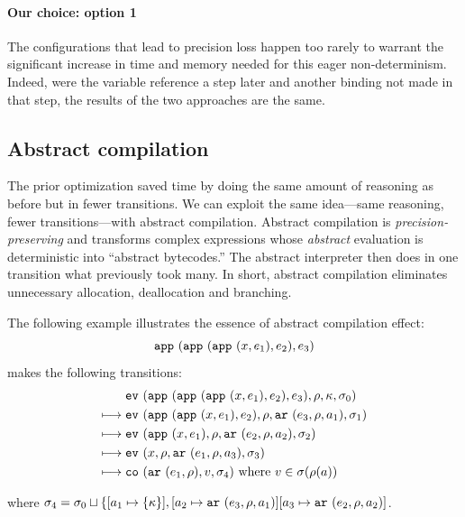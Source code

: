 \documentclass[preprint,onecolumn,9pt]{sigplanconf} %
\begin{document}
\paragraph{Our choice: option 1}
The configurations that lead to precision loss happen too rarely to
warrant the significant increase in time and memory needed for this
eager non-determinism. Indeed, were the variable reference a step
later and another binding not made in that step, the results of the
two approaches are the same.


\subsection{Abstract compilation}

The prior optimization saved time by doing the same amount of
reasoning as before but in fewer transitions. We can exploit the same
idea---same reasoning, fewer transitions---with abstract
compilation. Abstract compilation is \emph{precision-preserving} and
transforms complex expressions whose \emph{abstract} evaluation is
deterministic into ``abstract bytecodes.''  The abstract interpreter
then does in one transition what previously took many. In short, abstract
compilation eliminates unnecessary allocation, deallocation and
branching.

The following example illustrates
the essence of abstract compilation effect:
\[
{\tt app{\ }}({{\tt app{\ }}({{\tt app{\ }}({x,e_1}),e_2}),e_3})
\]
makes the following transitions:
\begin{align}
& \ev{\sapp{\sapp{\sapp\mvar{\mexp_1}}{\mexp_2}}{\mexp_3},\menv,\mkont,\msto_0}\\
\machstep\; &
\ev{\sapp{\sapp\mvar{\mexp_1}}{\mexp_2},\menv,\kar{\mexp_3,\menv,\maddr_1},\msto_1}
\\
\machstep\; &
\ev{\sapp\mvar{\mexp_1},\menv,\kar{\mexp_2,\menv,\maddr_2},\msto_2}
\\
\machstep\; &
\ev{\mvar, \menv,\kar{\mexp_1,\menv,\maddr_3},\msto_3} %
\\
\machstep\; &
\co{\kar{\mexp_1,\menv},\mval,\msto_4} %
\mbox{ where } \mval \in \msto(\menv(\maddr))
\end{align}

where $\sigma_4 = \sigma_0 \sqcup \{ [a_1 \mapsto \{ \kappa \}],
[a_2 \mapsto {\tt ar{\ }}({e_3,\rho,a_1})]
[a_3 \mapsto {\tt ar{\ }}({e_2,\rho,a_2})]$.
\end{document}
